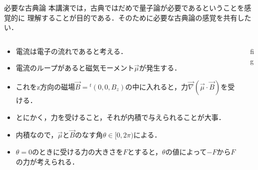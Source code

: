 \documentclass[dvipdfmx]{beamer}
\theoremstyle{break}
\begin{document}
\begin{frame}{必要な古典論}
		本講演では，古典ではだめで量子論が必要であるということを感覚的に
		理解することが目的である．そのために必要な古典論の感覚を共有したい．

		\begin{columns}
				\begin{column}{0.7\textwidth}
						\begin{itemize}
								\item 電流は電子の流れであると考える．
								\item 電流のループがあると磁気モーメント$\vec{\mu}$が発生する．
								\item これをz方向の磁場$\vec{B}={}^{t}(0, 0, B_z)$の中に入れると，力$\vec{\nabla}(\vec{\mu}\cdot\vec{B})$を受ける．
								\item とにかく，力を受けること，それが内積で与えられることが大事．
								\item 内積なので，$\vec{\mu}$と$\vec{B}$のなす角$\theta\in[0, 2\pi)$による．
								\item $\theta=0$のときに受ける力の大きさを$F$とすると，$\theta$の値によって$-F$から$F$の力が考えられる．
						\end{itemize}
				\end{column}
				\begin{column}{0.3\textwidth}
						fig
				\end{column}
		\end{columns}
\end{frame}
\end{document}
